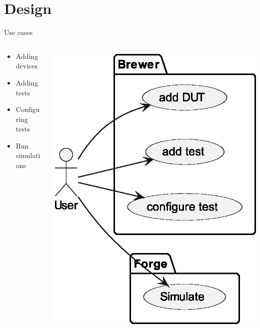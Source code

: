 \documentclass[aspectratio=169, handout]{beamer}
\begin{document}
\section{Design}
\begin{frame}{Use cases}
    \begin{columns}
        \begin{column}{.45\textwidth}
            \begin{itemize}
                \item Adding devices
                \item Adding tests
                \item Configuring tests
                \item Run simulations
            \end{itemize}
        \end{column}
        \begin{column}{.45\textwidth}
            \includegraphics[width=.8\columnwidth]{out/plantuml/usecase2/usecase2.eps}
        \end{column}
    \end{columns}
\end{frame}
\end{document}
